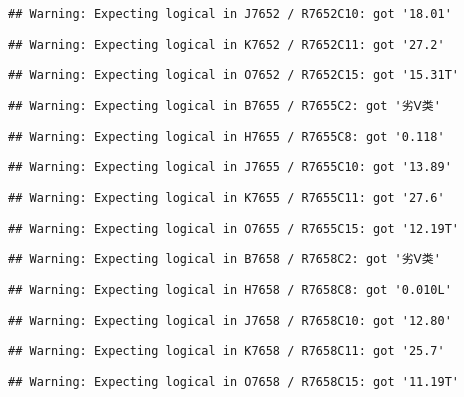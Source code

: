 \documentclass[
]{article}
\begin{document}
\begin{verbatim}
## Warning: Expecting logical in J7652 / R7652C10: got '18.01'
\end{verbatim}

\begin{verbatim}
## Warning: Expecting logical in K7652 / R7652C11: got '27.2'
\end{verbatim}

\begin{verbatim}
## Warning: Expecting logical in O7652 / R7652C15: got '15.31T'
\end{verbatim}

\begin{verbatim}
## Warning: Expecting logical in B7655 / R7655C2: got '劣Ⅴ类'
\end{verbatim}

\begin{verbatim}
## Warning: Expecting logical in H7655 / R7655C8: got '0.118'
\end{verbatim}

\begin{verbatim}
## Warning: Expecting logical in J7655 / R7655C10: got '13.89'
\end{verbatim}

\begin{verbatim}
## Warning: Expecting logical in K7655 / R7655C11: got '27.6'
\end{verbatim}

\begin{verbatim}
## Warning: Expecting logical in O7655 / R7655C15: got '12.19T'
\end{verbatim}

\begin{verbatim}
## Warning: Expecting logical in B7658 / R7658C2: got '劣Ⅴ类'
\end{verbatim}

\begin{verbatim}
## Warning: Expecting logical in H7658 / R7658C8: got '0.010L'
\end{verbatim}

\begin{verbatim}
## Warning: Expecting logical in J7658 / R7658C10: got '12.80'
\end{verbatim}

\begin{verbatim}
## Warning: Expecting logical in K7658 / R7658C11: got '25.7'
\end{verbatim}

\begin{verbatim}
## Warning: Expecting logical in O7658 / R7658C15: got '11.19T'
\end{verbatim}
\end{document}
